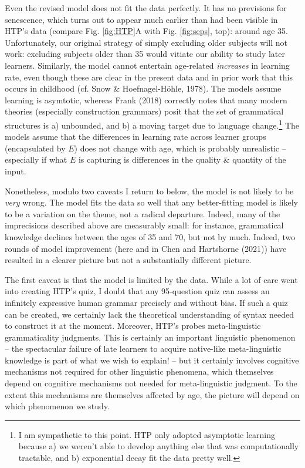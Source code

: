\documentclass[
  english,
  doc,floatsintext]{apa6}
\begin{document}
Even the revised model does not fit the data perfectly. It has no previsions for senescence, which turns out to appear much earlier than had been visible in HTP's data (compare Fig. \ref{fig:HTP}A with Fig. \ref{fig:seps}, top): around age 35. Unfortunately, our original strategy of simply excluding older subjects will not work: excluding subjects older than 35 would vitiate our ability to study later learners. Similarly, the model cannot entertain age-related \emph{increases} in learning rate, even though these are clear in the present data and in prior work that this occurs in childhood (cf. Snow \& Hoefnagel-Höhle, 1978). The models assume learning is asymtotic, whereas Frank (2018) correctly notes that many modern theories (especially construction grammars) posit that the set of grammatical structures is a) unbounded, and b) a moving target due to language change.\footnote{I am sympathetic to this point. HTP only adopted asymptotic learning because a) we weren't able to develop anything else that was computationally tractable, and b) exponential decay fit the data pretty well.} The models assume that the differences in learning rate across learner groups (encapsulated by \(E\)) does not change with age, which is probably unrealistic -- especially if what \(E\) is capturing is differences in the quality \& quantity of the input.

Nonetheless, modulo two caveats I return to below, the model is not likely to be \emph{very} wrong. The model fits the data so well that any better-fitting model is likely to be a variation on the theme, not a radical departure. Indeed, many of the imprecisions described above are measurably small: for instance, grammatical knowledge declines between the ages of 35 and 70, but not by much. Indeed, two rounds of model improvement (here and in Chen and Hartshorne (2021)) have resulted in a clearer picture but not a substantially different picture.

The first caveat is that the model is limited by the data. While a lot of care went into creating HTP's quiz, I doubt that any 95-question quiz can assess an infinitely expressive human grammar precisely and without bias. If such a quiz can be created, we certainly lack the theoretical understanding of syntax needed to construct it at the moment. Moreover, HTP's probes meta-linguistic grammaticality judgments. This is certainly an important linguistic phenomenon -- the spectacular failure of late learners to acquire native-like meta-linguistic knowledge is part of what we wish to explain! -- but it certainly involves cognitive mechanisms not required for other linguistic phenomena, which themselves depend on cognitive mechanisms not needed for meta-linguistic judgment. To the extent this mechanisms are themselves affected by age, the picture will depend on which phenomenon we study.
\end{document}
